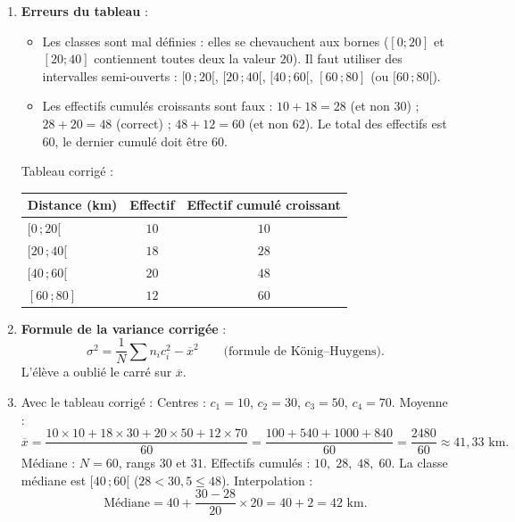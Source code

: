\documentclass[11pt]{article}
\begin{document}
\begin{corrige}
\begin{enumerate}
\item \textbf{Erreurs du tableau} :
\begin{itemize}
\item Les classes sont mal définies : elles se chevauchent aux bornes ($[0;20]$ et $[20;40]$ contiennent toutes deux la valeur $20$). Il faut utiliser des intervalles semi-ouverts : $[0\,;20[$, $[20\,;40[$, $[40\,;60[$, $[60\,;80]$ (ou $[60\,;80[$).
\item Les effectifs cumulés croissants sont faux : 
$10+18=28$ (et non $30$) ; $28+20=48$ (correct) ; $48+12=60$ (et non $62$). Le total des effectifs est $60$, le dernier cumulé doit être $60$.
\end{itemize}
Tableau corrigé :
\begin{center}
\begin{tabular}{|l|c|c|}
\hline
\rowcolor{popblueL} Distance (km) & Effectif & Effectif cumulé croissant \\
\hline
$[0\,; 20[$ & $10$ & $10$ \\
$[20\,; 40[$ & $18$ & $28$ \\
$[40\,; 60[$ & $20$ & $48$ \\
$[60\,; 80]$ & $12$ & $60$ \\
\hline
\end{tabular}
\end{center}
\item \textbf{Formule de la variance corrigée} :
\[
\sigma^2 = \frac{1}{N}\sum n_i c_i^2 - \overline{x}^2 \qquad \text{(formule de König–Huygens)}.
\]
L'élève a oublié le carré sur $\overline{x}$.
\item Avec le tableau corrigé :
Centres : $c_1=10$, $c_2=30$, $c_3=50$, $c_4=70$.
Moyenne :
\[
\overline{x} = \frac{10\times10 + 18\times30 + 20\times50 + 12\times70}{60}
= \frac{100+540+1000+840}{60} = \frac{2480}{60} \approx 41,33 \text{ km}.
\]
Médiane : $N=60$, rangs $30$ et $31$. Effectifs cumulés : $10,\;28,\;48,\;60$. La classe médiane est $[40\,;60[$ ($28 < 30,5 \le 48$). Interpolation :
\[
\text{Médiane} = 40 + \frac{30 - 28}{20}\times 20 = 40 + 2 = 42 \text{ km}.
\]
\end{enumerate}
\end{corrige}
\end{document}

